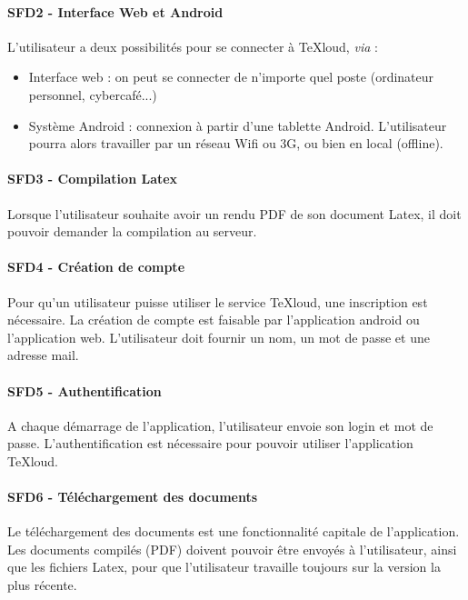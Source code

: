 \documentclass[a4paper,12pt]{article}
\begin{document}
\paragraph{SFD2 - Interface Web et Android\\}
L'utilisateur a deux possibilités pour se connecter à TeXloud, \emph{via} :\\
\begin{itemize}
 \item Interface web : on peut se connecter de n'importe quel poste (ordinateur personnel, cybercafé...)
 \item Système Android : connexion à partir d'une tablette Android. L'utilisateur pourra alors 
travailler par un réseau Wifi ou 3G, ou bien en local (offline).
\end{itemize}

\paragraph{SFD3 - Compilation Latex\\}
Lorsque l'utilisateur souhaite avoir un rendu PDF de son document Latex, il doit pouvoir demander 
la compilation au serveur.

\paragraph{SFD4 - Création de compte\\}
Pour qu'un utilisateur puisse utiliser le service TeXloud, une inscription est nécessaire. La 
création de compte est faisable par l'application android ou l'application web. L'utilisateur doit
fournir un nom, un mot de passe et une adresse mail.

\paragraph{SFD5 - Authentification\\}
A chaque démarrage de l'application, l'utilisateur envoie son login et mot de passe. L'authentification
est nécessaire pour pouvoir utiliser l'application TeXloud.

\paragraph{SFD6 - Téléchargement des documents\\}
Le téléchargement des documents est une fonctionnalité capitale de l'application. Les documents 
compilés (PDF) doivent pouvoir être envoyés à l'utilisateur, ainsi que les fichiers Latex, pour que 
l'utilisateur travaille toujours sur la version la plus récente.
\end{document}
